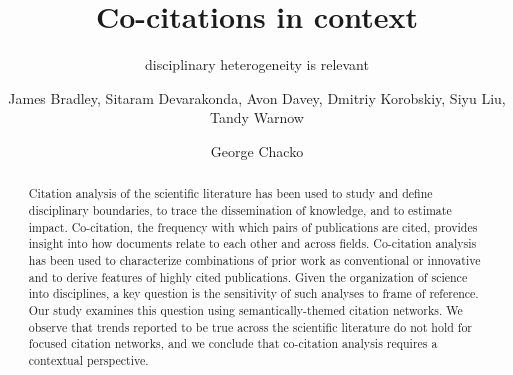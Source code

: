 \documentclass[NETN]{stjour}
\begin{document}
\title[Co-citations in context]{Co-citations in context}
\subtitle{disciplinary heterogeneity is relevant}



\author[Author Names]
{James Bradley,
Sitaram Devarakonda, Avon Davey, Dmitriy Korobskiy, Siyu Liu, Tandy Warnow
\and George Chacko}










\begin{abstract}
Citation analysis of the scientific literature has been used to study and define disciplinary boundaries, to trace the dissemination of knowledge, and to estimate impact. Co-citation, the frequency with which pairs of publications are cited, provides insight into how documents relate to each other and across fields. Co-citation analysis has been used to characterize combinations of prior work as conventional or innovative and to derive features of highly cited publications. Given the organization of science into disciplines, a key question is the sensitivity of such analyses to frame of reference. Our study examines this question using  semantically-themed citation networks. We observe that trends reported to be true across the scientific literature do not hold for focused citation networks, and we conclude that co-citation analysis requires a contextual perspective.
\end{abstract}
\end{document}
